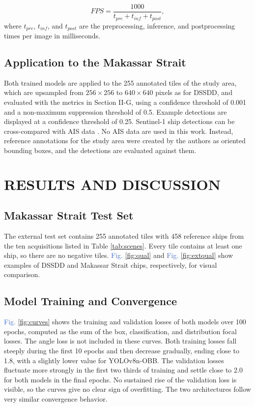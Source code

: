 \documentclass[conference]{IEEEtran}
\begin{document}
\begin{equation}
	FPS = \frac{1000}{t_{pre} + t_{inf} + t_{post}},
	\label{eq:fps}
\end{equation}
where $t_{pre}$, $t_{inf}$, and $t_{post}$ are the preprocessing, inference, and postprocessing times per image in milliseconds.

\subsection{Application to the Makassar Strait}
Both trained models are applied to the 255 annotated tiles of the study area, which are upsampled from $256 \times 256$ to $640 \times 640$ pixels as for DSSDD, and evaluated with the metrics in Section II-G, using a confidence threshold of 0.001 and a non-maximum suppression threshold of 0.5. Example detections are displayed at a confidence threshold of 0.25. Sentinel-1 ship detections can be cross-compared with AIS data \cite{pelich2019}. No AIS data are used in this work. Instead, reference annotations for the study area were created by the authors as oriented bounding boxes, and the detections are evaluated against them.

\section{RESULTS AND DISCUSSION}
\subsection{Makassar Strait Test Set}
The external test set contains 255 annotated tiles with 458 reference ships from the ten acquisitions listed in Table \ref{tab:scenes}. Every tile contains at least one ship, so there are no negative tiles. \textcolor{RoyalBlue}{Fig.} \ref{fig:qual} and \textcolor{RoyalBlue}{Fig.} \ref{fig:extqual} show examples of DSSDD and Makassar Strait chips, respectively, for visual comparison.

\subsection{Model Training and Convergence}
\textcolor{RoyalBlue}{Fig.} \ref{fig:curves} shows the training and validation losses of both models over 100 epochs, computed as the sum of the box, classification, and distribution focal losses. The angle loss is not included in these curves. Both training losses fall steeply during the first 10 epochs and then decrease gradually, ending close to 1.8, with a slightly lower value for YOLOv8n-OBB. The validation losses fluctuate more strongly in the first two thirds of training and settle close to 2.0 for both models in the final epochs. No sustained rise of the validation loss is visible, so the curves give no clear sign of overfitting. The two architectures follow very similar convergence behavior.
\end{document}
